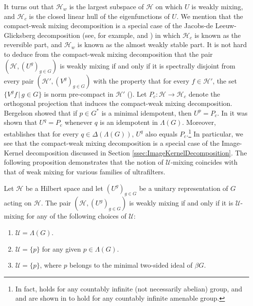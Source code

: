 \documentclass[graybox]{svmult}
\theoremstyle{definition}
\begin{document}
It turns out that $\mathcal{H}_w$ is the largest subspace of $\mathcal{H}$ on which $U$ is weakly mixing, and $\mathcal{H}_c$ is the closed linear hull of the eigenfunctions of $U$.
We mention that the compact-weak mixing decomposition is a special case of the Jacobs-de Leeuw-Glicksberg decomposition (see, for example, \cite[Chapter 16]{OTAoET} and \cite{JdLGDecompositionSurvey}) in which $\mathcal{H}_c$ is known as the reversible part, and $\mathcal{H}_w$ is known as the almost weakly stable part.
It is not hard to deduce from the compact-weak mixing decomposition that the pair $(\mathcal H, (U^g)_{g\in G})$ is weakly mixing if and only if it is spectrally disjoint from every pair $(\mathcal H',(V^g)_{g\in G})$ with the property that for every $f\in\mathcal H'$, the set $\{V^g f\,|\,g\in G\}$ is norm pre-compact in $\mathcal H'$ (\cite[Theorem 1.9]{BerRosWeakMixingActions1988}).
Let $P_c:\mathcal{H}\rightarrow\mathcal{H}_c$ denote the orthogonal projection that induces the compact-weak mixing decomposition.
Bergelson \cite[Corollary 4.6]{MinimalIdempotentsAndERT} showed that if $p \in G^*$ is a minimal idempotent, then $U^p = P_c$.
In  \cite[Theorem 2.25]{ProjectionLemma} it was shown that $U^q = P_c$ whenever  $q$ is an idempotent in $\Lambda(G)$. Moreover, 
\cite[Theorem 5.2]{JdLGDecompositionSurvey} establishes that for every $q\in\Delta(\Lambda(G))$, $U^q$ also equals $P_c$.\footnote{In fact, \cite[Corollary 4.6]{MinimalIdempotentsAndERT} holds for any countably infinite (not necessarily abelian) group, and \cite[Theorem 2.25]{ProjectionLemma} and \cite[Theorem 5.2]{JdLGDecompositionSurvey} are shown in  \cite{JdLGDecompositionSurvey} to hold for any countably infinite amenable group.}
In particular, we see that the compact-weak mixing decomposition is a special case of the Image-Kernel decomposition discussed in Section \ref{ssec:ImageKernelDecomposition}.
The following proposition demonstrates that the notion of $\mathcal U$-mixing coincides with that of weak mixing for various families of ultrafilters. 
\begin{proposition}\label{3.Prop:WeakMixingCharacterizations}
    Let $\mathcal H$ be a Hilbert space and let $(U^g)_{g\in G}$ be a unitary representation of $G$ acting on $\mathcal H$. The pair $(\mathcal H,(U^g)_{g\in G})$ is weakly mixing if and only if it is $\mathcal U$-mixing for any of the following choices of $\mathcal U$:
    \begin{enumerate}
        \item $\mathcal U=\Lambda(G)$.
     \item $\mathcal U=\{p\}$ for any given $p\in\Lambda(G)$.
    \item $\mathcal U=\{p\}$, where $p$ belongs to the  minimal two-sided ideal of $\beta G$.
    \end{enumerate}
\end{proposition}
\end{document}
